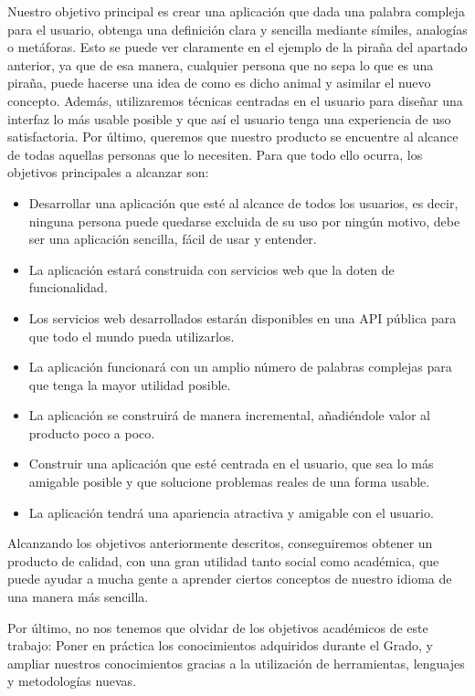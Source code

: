 Nuestro objetivo principal es crear una aplicación que dada una palabra compleja para el usuario, obtenga una definición clara y sencilla mediante símiles, analogías o metáforas. 
Esto se puede ver claramente en el ejemplo de la piraña del apartado anterior, ya que de esa manera, cualquier persona que no sepa lo que es una piraña, puede hacerse una idea de como es dicho animal y asimilar el nuevo concepto. Además, utilizaremos técnicas centradas en el usuario para diseñar una interfaz lo más usable posible y que así el usuario tenga una experiencia de uso satisfactoria. Por último, queremos que nuestro producto se encuentre al alcance de todas aquellas personas que lo necesiten.
 Para que todo ello ocurra, los objetivos principales a alcanzar son:
\begin{itemize}
	\item Desarrollar una aplicación que esté al alcance de todos los usuarios, es decir, ninguna persona puede quedarse excluida de su uso por ningún motivo, debe ser una aplicación sencilla, fácil de usar y entender.
	\item La aplicación estará construida con servicios web que la doten de funcionalidad.
	\item Los servicios web desarrollados estarán disponibles en una API pública para que todo el mundo pueda utilizarlos.	
	\item La aplicación funcionará con un amplio número de palabras complejas para que tenga la mayor utilidad posible.
	\item La aplicación se construirá de manera incremental, añadiéndole valor al producto poco a poco.	
	\item Construir una aplicación que esté centrada en el usuario, que sea lo más amigable posible y que solucione problemas reales de una forma usable.		
	\item La aplicación tendrá una apariencia atractiva y amigable con el usuario.
\end{itemize}
Alcanzando los objetivos anteriormente descritos, conseguiremos obtener un producto de calidad, con una gran utilidad tanto social como académica, que puede ayudar a mucha gente a aprender ciertos conceptos de nuestro idioma de una manera más sencilla.

Por último, no nos tenemos que olvidar de los objetivos académicos de este trabajo: Poner en práctica los conocimientos adquiridos durante el Grado, y ampliar nuestros conocimientos gracias a la utilización de herramientas, lenguajes y metodologías nuevas.
	
